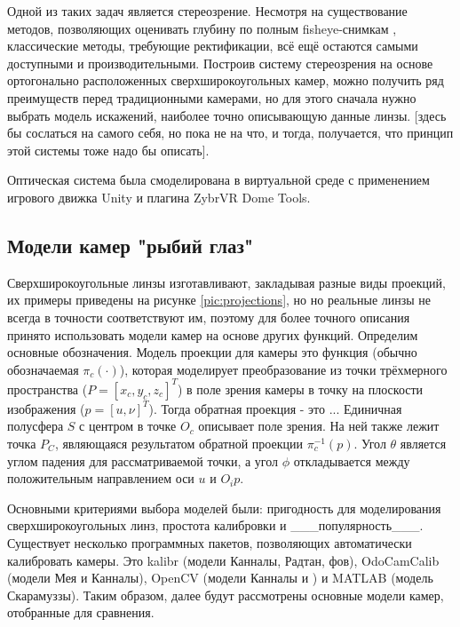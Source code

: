 Одной из таких задач является стереозрение. Несмотря на существование методов, позволяющих оценивать глубину по полным fisheye-снимкам \cite{full_fisheye_stereo}, 
классические методы, требующие ректификации, всё ещё остаются самыми доступными и производительными. Построив систему стереозрения на 
основе ортогонально расположенных сверхширокоугольных камер, можно получить ряд преимуществ перед традиционными камерами, но для этого 
сначала нужно выбрать модель искажений, наиболее точно описывающую данные линзы. [здесь бы сослаться на самого себя, но пока не на что,
и тогда, получается, что принцип этой системы тоже надо бы описать].

Оптическая система была смоделирована в виртуальной среде с применением игрового движка Unity и плагина ZybrVR Dome Tools. %

\subsection{Модели камер "рыбий глаз"}

Сверхширокоугольные линзы изготавливают, закладывая разные виды проекций, их примеры приведены на рисунке \ref{pic:projections}, но 
но реальные линзы не всегда в точности соответствуют им, поэтому для более точного описания принято использовать модели
камер на основе других функций.
Определим основные обозначения. Модель проекции для камеры это функция (обычно обозначаемая $\pi_c(\cdot )$), которая моделирует преобразование 
из точки трёхмерного пространства ($P=[x_c, y_c, z_c]^T$) в поле зрения камеры в точку на плоскости изображения ($p=[u, \nu]^T$). Тогда обратная
проекция - это ... Единичная            %
полусфера $S$ с центром в точке $O_c$ описывает поле зрения. На ней также лежит точка $P_C$, являющаяся результатом обратной проекции $\pi^{-1}_c({p})$.
Угол $\theta$ является углом падения для рассматриваемой точки, а угол $\phi$ откладывается между положительным направлением оси $u$ и $O_{i}{p}$. 

Основными критериями выбора моделей были: пригодность для моделирования 
сверхширокоугольных линз, простота калибровки и ___популярность___. Существует несколько программных пакетов, позволяющих автоматически калибровать камеры. 
Это kalibr (модели Канналы, Радтан, фов), OdoCamCalib (модели Мея и Канналы), OpenCV (модели Канналы и ) и MATLAB (модель Скарамуззы). Таким образом, далее 
будут рассмотрены основные модели камер, отобранные для сравнения. 


